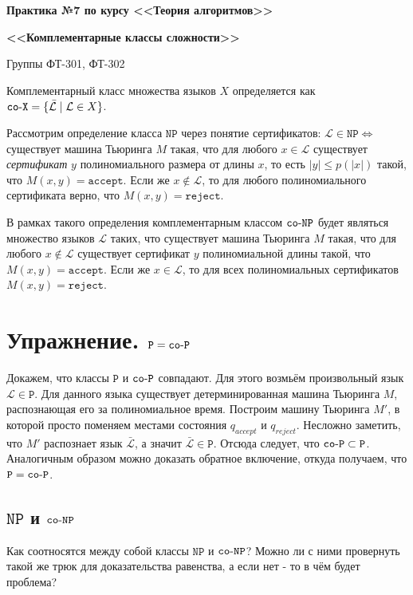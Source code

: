 \documentclass[
    11pt,
    a4paper
]{article}
\theoremstyle{definition}
\begin{document}
\centerline{\Large \bf Практика №7 по курсу <<Теория алгоритмов>>}
\centerline{\Large \bf <<Комплементарные классы сложности>>}
\centerline{Группы ФТ-301, ФТ-302}

Комплементарный класс множества языков $X$ определяется как $\mathtt{co{\text -}X} = \{\bar{\mathcal{L}} \mid \mathcal{L} \in X\}$.

Рассмотрим определение класса $\mathtt{NP}$ через понятие сертификатов: $\mathcal{L} \in \mathtt{NP} \Leftrightarrow$ существует машина Тьюринга $M$ такая, что для любого $x \in \mathcal{L}$ существует \textit{сертификат} $y$ полиномиального размера от длины $x$, то есть $|y| \leq p(|x|)$ такой, что $M(x, y) = \texttt{accept}$. Если же $x \notin \mathcal{L}$, то для любого полиномиального сертификата верно, что $M(x, y) = \texttt{reject}$.

В рамках такого определения комплементарным классом $\mathtt{co{\text -}NP}$ будет являться множество языков $\mathcal{L}$ таких, что существует машина Тьюринга $M$ такая, что  для любого $x \notin \mathcal{L}$ существует сертификат $y$ полиномиальной длины такой, что $M(x, y) = \texttt{accept}$. Если же $x \in \mathcal{L}$, то для всех полиномиальных сертификатов $M(x, y) = \texttt{reject}$.

\section{Упражнение. $\mathtt{P} = \mathtt{co{\text -}P}$}

Докажем, что классы $\mathtt{P}$ и $\mathtt{co{\text -}P}$ совпадают. Для этого возмьём произвольный язык $\mathcal{L} \in \mathtt{P}$. Для данного языка существует детерминированная машина Тьюринга $M$, распознающая его за полиномиальное время. Построим машину Тьюринга $M'$, в которой просто поменяем местами состояния $q_{accept}$ и $q_{reject}$. Несложно заметить, что $M'$ распознает язык $\bar{\mathcal{L}}$, а значит $\bar{\mathcal{L}} \in \mathtt{P}$. Отсюда следует, что $\mathtt{co{\text -}P} \subset \mathtt{P}$. Аналогичным образом можно доказать обратное включение, откуда получаем, что $\mathtt{P} = \mathtt{co{\text -}P}$.

\subsection{$\mathtt{NP}$ и $\mathtt{co{\text -}NP}$}
Как соотносятся между собой классы $\mathtt{NP}$ и $\mathtt{co{\text -}NP}$? Можно ли с ними провернуть такой же трюк для доказательства равенства, а если нет - то в чём будет проблема?
\end{document}
